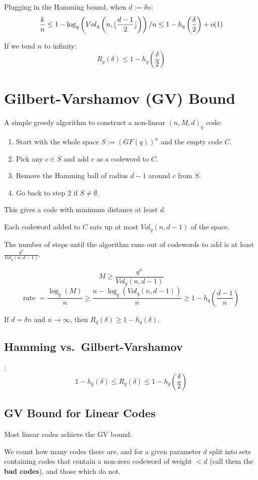 \documentclass[11pt]{article}
\DeclarePairedDelimiter\floor{\lfloor}{\rfloor}
\begin{document}
Plugging in the Hamming bound, when $d := \delta n$:
\[
  \frac{k}{n} \leq 1 - \log_q\left(Vol_q \left(n, \floor{\frac{d - 1}{2}}\right)\right) / n
  \leq 1 - h_q \left(\frac{\delta}{2}\right) + o(1)
\]

If we tend $n$ to infinity:
\[
  R_q(\delta) \leq 1 - h_q \left(\frac{\delta}{2}\right)
\]

\section{Gilbert-Varshamov (GV) Bound}
A simple greedy algorithm to construct a non-linear $(n, M, d)_q$ code:
\begin{enumerate}
  \item Start with the whole space $S := (GF(q))^n$ and the empty code $C$.
  \item Pick any $c \in S$ and add $c$ as a codeword to $C$.
  \item Remove the Hamming ball of radius $d - 1$ around $c$ from $S$.
  \item Go back to step $2$ if $S \neq \emptyset$.
\end{enumerate}

This gives a code with minimum distance at least $d$.

Each codeword added to $C$ eats up at most $Vol_q(n, d - 1)$ of the space.

The number of steps until the algorithm runs out of codewords to add is at least $\frac{q^n}{Vol_q(n, d - 1)}$.

\[
  M \geq \frac{q^n}{Vol_q(n, d - 1)}
\]
\[
  \text{rate } = \frac{\log_q(M)}{n} \geq \frac{n - \log_q(Vol_q(n, d - 1))}{n} \geq 1 - h_q \left(\frac{d - 1}{n}\right)
\]

If $d = \delta n$ and $n \rightarrow \infty$, then $R_q(\delta) \geq 1 - h_q(\delta)$.

\subsection{Hamming vs.\ Gilbert-Varshamov}:
\[
  1 - h_q(\delta) \leq R_q(\delta) \leq 1 - h_q \left(\frac{\delta}{2}\right)
\]

\subsection{GV Bound for Linear Codes}
Most linear codes achieve the GV bound.

We count how many codes there are, and for a given parameter $d$ split into sets containing codes that contain a non-zero codeword of weight $< d$ (call them the \textbf{bad codes}), and those which do not.
\end{document}
